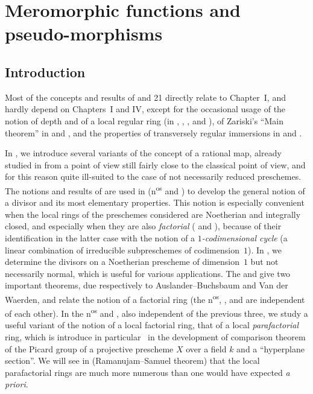 \section{Meromorphic functions and pseudo-morphisms}
\label{IV.20}

\setcounter{subsection}{-1}
\subsection{Introduction}
\label{IV.20.0}

Most of the concepts and results of \textsection{} and 21 directly relate to Chapter~I, and hardly depend on Chapters~I and IV, except for the occasional usage of the notion of depth and of a local regular ring (in , , , and ), of Zariski's ``Main theorem'' in  and , and the properties of transversely regular immersions in  and .

In , we introduce several variants of the concept of a rational map, already studied in  from a point of view still fairly close to the classical point of view, and for this reason quite ill-suited to the case of not necessarily reduced preschemes.
The notions and results of  are used in  (n\textsuperscript{os} and ) to develop the general notion of a divisor and its most elementary properties.
This notion is especially convenient when the local rings of the preschemes considered are Noetherian and integrally closed, and especially when they are also \emph{factorial} ( and ), because of their identification in the latter case with the notion of a \emph{$1$-codimensional cycle} (a linear combination of irreducible subpreschemes of codimension~$1$).
In ,  we determine the divisors on a Noetherian prescheme of dimension~$1$ but not necessarily normal, which is useful for various applications.
The  and  give two important theorems, due respectively to Auslander--Buchsbaum and Van der Waerden, and relate the notion of a factorial ring (the n\textsuperscript{os}, , and  are independent of each other).
In the n\textsuperscript{os} and , also independent of the previous three, we study a useful variant of the notion of a local factorial ring, that of a local \emph{parafactorial} ring, which is introduce in particular~\cite{IV-41} in the development of comparison theorem of the Picard group of a projective prescheme $X$ over a field $k$ and a ``hyperplane section''.
We will see in  (Ramanujam--Samuel theorem) that the local parafactorial rings are much more numerous than one would have expected \emph{a priori}.

